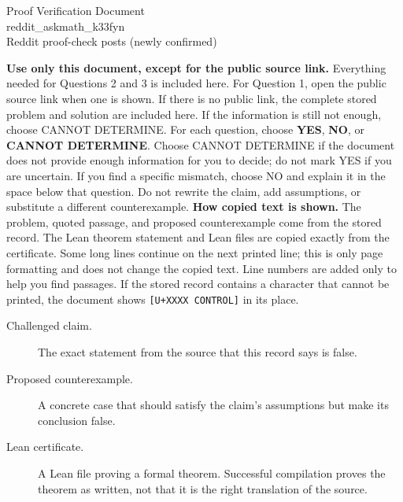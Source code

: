 \documentclass[11pt]{article}
\begin{document}
\begin{center}{\LARGE Proof Verification Document}\\[2pt]{\large reddit\_askmath\_k33fyn}\\[2pt]{\small Reddit proof-check posts (newly confirmed)}\end{center}
\begin{center}\end{center}
\textbf{Use only this document, except for the public source link.} Everything needed for Questions 2 and 3 is included here. For Question 1, open the public source link when one is shown. If there is no public link, the complete stored problem and solution are included here. If the information is still not enough, choose CANNOT DETERMINE.
For each question, choose \textbf{YES}, \textbf{NO}, or \textbf{CANNOT DETERMINE}. Choose CANNOT DETERMINE if the document does not provide enough information for you to decide; do not mark YES if you are uncertain. If you find a specific mismatch, choose NO and explain it in the space below that question. Do not rewrite the claim, add assumptions, or substitute a different counterexample.
\textbf{How copied text is shown.} The problem, quoted passage, and proposed counterexample come from the stored record. The Lean theorem statement and Lean files are copied exactly from the certificate. Some long lines continue on the next printed line; this is only page formatting and does not change the copied text. Line numbers are added only to help you find passages. If the stored record contains a character that cannot be printed, the document shows \texttt{[U+XXXX CONTROL]} in its place.
\begin{description}
\item[Challenged claim.] The exact statement from the source that this record says is false.
\item[Proposed counterexample.] A concrete case that should satisfy the claim's assumptions but make its conclusion false.
\item[Lean certificate.] A Lean file proving a formal theorem. Successful compilation proves the theorem as written, not that it is the right translation of the source.
\end{description}
\end{document}
